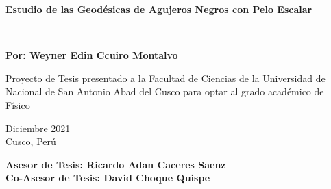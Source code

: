 \documentclass[../Main.tex]{subfiles}
\begin{document}
\begin{titlepage}
	
	
	\thispagestyle{frontpage}
	
	\begin{center}
		
		\vspace*{4\baselineskip}
	
		
		{\Huge \textbf{Estudio de las Geodésicas de Agujeros Negros con Pelo Escalar\\}}%
		        \vspace*{1.5\baselineskip}

		\large{\textit{}}\\ %
		
        \vspace*{1,5\baselineskip}

		\large{\textbf{Por: Weyner Edin Ccuiro Montalvo}}\\ %
		
		\vspace{1,5\baselineskip}
		
		\large{Proyecto de Tesis presentado a la Facultad de Ciencias de la Universidad de Nacional de San Antonio Abad del Cusco para optar al grado académico de Físico} %
		
		\vspace{1,5\baselineskip}
		Diciembre 2021\\ %
		Cusco, Perú %
\vspace{1,5\baselineskip}

		\large{\textbf{Asesor de Tesis: Ricardo Adan Caceres Saenz \\ Co-Asesor de Tesis: David Choque Quispe}}\\ %

	\end{center}
	
	\vspace*{4\baselineskip}
	
	
\end{titlepage}
\end{document}
